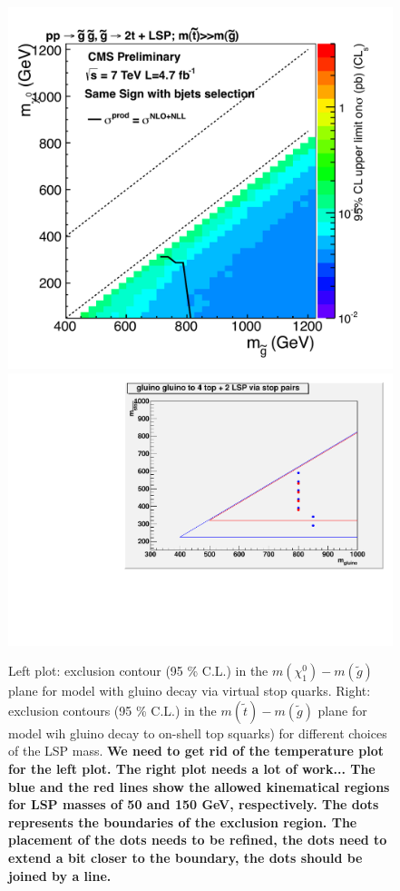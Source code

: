 \begin{figure}[bht]
\begin{center}
\includegraphics[width=0.49\linewidth]{figs/T1tttt.pdf}
\includegraphics[width=0.49\linewidth]{figs/gluinoStop_fkw}
\caption{Left plot: exclusion contour (95 \% C.L.) in the 
$m(\chi^0_1)-m(\widetilde{g})$ 
plane for model with gluino decay via virtual stop quarks.
Right: exclusion contours (95 \% C.L.) in the 
$m(\widetilde{t})-m(\widetilde{g})$
plane for model wih gluino decay to on-shell top squarks)
for different choices of the LSP mass.  
{\bf We need to get rid of the temperature plot for the
left plot.  The right plot needs a lot of work...
The blue and the red lines show the allowed
kinematical regions for LSP masses of 50 and 150 GeV,
respectively.  The dots represents the boundaries of 
the exclusion region.  The placement of the dots needs 
to be refined, the dots need to extend a bit closer to
the boundary, the dots should be joined by a line.} 
\label{fig:stoppaper}}
\end{center}
\end{figure}



